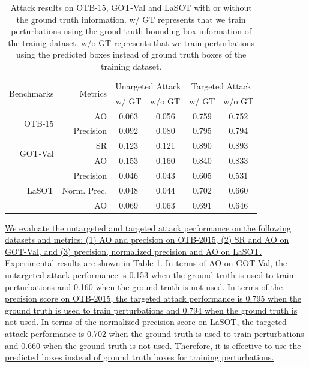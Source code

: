 \documentclass[12pt]{article}
\begin{document}
\begin{table}[t]
  \renewcommand\thetable{VII}
  \centering
  \caption{Attack results on OTB-15, GOT-Val and LaSOT with or without the ground truth information. w/ GT represents that we train perturbations using the groud truth bounding box information of the trainig dataset. w/o GT represents that we train perturbations using the predicted boxes instead of ground truth boxes of the training dataset.}
  \begin{tabular}{rrcccc}
  \toprule
  \multirow{2}{*}[-2pt]{Benchmarks} & \multirow{2}{*}[-2pt]{Metrics} & \multicolumn{2}{c}{Unargeted Attack} & \multicolumn{2}{c}{Targeted Attack} \\ \cmidrule{3-6}
                              &                          & w/ GT  & \multicolumn{1}{l}{w/o GT}  & w/ GT  & \multicolumn{1}{l}{w/o GT} \\ \midrule
  \multirow{2}{*}{OTB-15}     & AO                       & 0.063  & 0.056                       & 0.759  & 0.752                      \\
                              & Precision                & 0.092  & 0.080                       & 0.795  & 0.794                      \\ \midrule
  \multirow{2}{*}{GOT-Val}    & SR                       & 0.123  & 0.121                       & 0.890  & 0.893                      \\
                              & AO                       & 0.153  & 0.160                       & 0.840  & 0.833                      \\ \midrule
  \multirow{3}{*}{LaSOT}      & Precision                & 0.046  & 0.043                       & 0.605  & 0.531                      \\
                              & Norm. Prec.              & 0.048  & 0.044                       & 0.702  & 0.660                      \\
                              & AO                       & 0.069  & 0.063                       & 0.691  & 0.646                      \\ \bottomrule
  \end{tabular}
  \label{tab:agent_GT}
\end{table}

\uline{We evaluate the untargeted and targeted attack performance on the following datasets and metrics: (1) AO and precision on OTB-2015, (2) SR and AO on GOT-Val, and (3) precision, normalized precision and AO on LaSOT.
Experimental results are shown in Table \ref{tab:agent_GT}.
In terms of AO on GOT-Val, the untargeted attack performance is 0.153 when the ground truth is used to train perturbations and 0.160 when the ground truth is not used.
In terms of the precision score on OTB-2015, the targeted attack performance is 0.795 when the ground truth is used to train perturbations and 0.794 when the ground truth is not used.
In terms of the normalized precision score on LaSOT, the targeted attack performance is 0.702 when the ground truth is used to train perturbations and 0.660 when the ground truth is not used.
Therefore, it is effective to use the predicted boxes instead of ground truth boxes for training perturbations.
}
\end{document}
